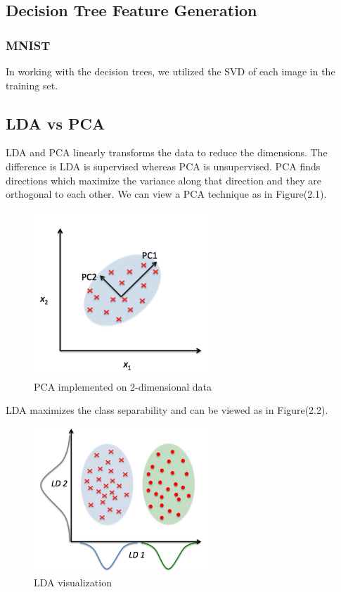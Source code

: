 \subsection{Decision Tree Feature Generation}

\subsubsection{MNIST}

In working with the decision trees, we utilized the SVD of each image in the training set. 


\subsection{LDA vs PCA}

LDA and PCA linearly transforms the data to reduce the dimensions. The difference is LDA is supervised whereas PCA is unsupervised. PCA finds directions which maximize the variance along that direction and they are orthogonal to each other. We can view a PCA technique as in Figure(2.1). 

	\begin{figure}[H]
		\centering\includegraphics[width=0.6\textwidth]{../images/pca}
		\caption{PCA implemented on 2-dimensional data}
	\end{figure}

LDA maximizes the class separability and can be viewed as in Figure(2.2). 
	\begin{figure}[H]
	\centering\includegraphics[width=0.6\textwidth]{../images/lda}
	\caption{LDA visualization}
	\end{figure}

